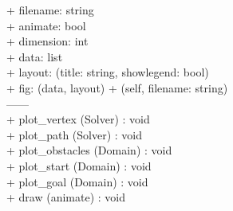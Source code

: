 {
+ filename: string \\
+ animate: bool \\
+ dimension: int \\
+ data: list \\ %
+ layout: (title: string, showlegend: bool) \\  
+ fig: (data, layout) 
}
{
+ \dunder (self, filename: string) \\ %
------\\
+ plot\_vertex (Solver) : void \\
+ plot\_path (Solver) : void \\
+ plot\_obstacles (Domain) : void \\
+ plot\_start (Domain) : void \\
+ plot\_goal (Domain) : void \\
+ draw (animate) : void %
}